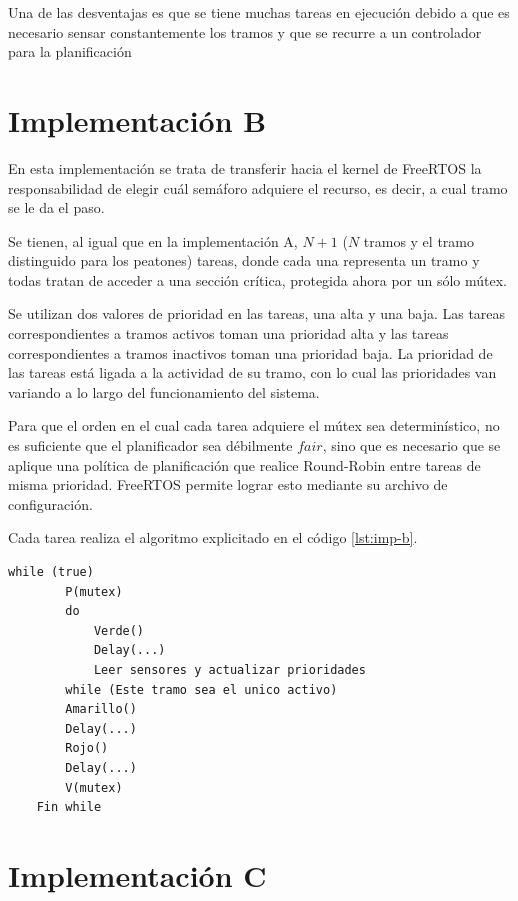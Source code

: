 Una de las desventajas es que se tiene muchas tareas en ejecución debido a que es necesario sensar constantemente los tramos y que se recurre a un controlador para la planificación

\section{Implementación B}
En esta implementación se trata de transferir hacia el kernel de FreeRTOS la responsabilidad de elegir cuál semáforo adquiere el recurso, es decir, a cual tramo se le da el paso.

Se tienen, al igual que en la implementación A, $N + 1$ ($N$ tramos y el tramo distinguido para los peatones) tareas, donde cada una representa un tramo y todas tratan de acceder a una sección crítica, protegida ahora por un sólo mútex.

Se utilizan dos valores de prioridad en las tareas, una alta y una baja. Las tareas correspondientes a tramos activos toman una prioridad alta y las tareas correspondientes a tramos inactivos toman una prioridad baja. La prioridad de las tareas está ligada a la actividad de su tramo, con lo cual las prioridades van variando a lo largo del funcionamiento del sistema.

Para que el orden en el cual cada tarea adquiere el mútex sea determinístico, no es suficiente que el planificador sea débilmente $fair$, sino que es necesario que se aplique una política de planificación que realice Round-Robin entre tareas de misma prioridad. FreeRTOS permite lograr esto mediante su archivo de configuración.

Cada tarea realiza el algoritmo explicitado en el código \ref{lst:imp-b}.

\begin{lstlisting}[label=lst:imp-b, caption=Pseudocódigo del programa que corre cada tarea en la implementación B.]
	while (true)
		P(mutex)
		do
			Verde()
			Delay(...)
			Leer sensores y actualizar prioridades
		while (Este tramo sea el unico activo)
		Amarillo()
		Delay(...)
		Rojo()
		Delay(...)
		V(mutex)
	Fin while
\end{lstlisting}

\section{Implementación C}
